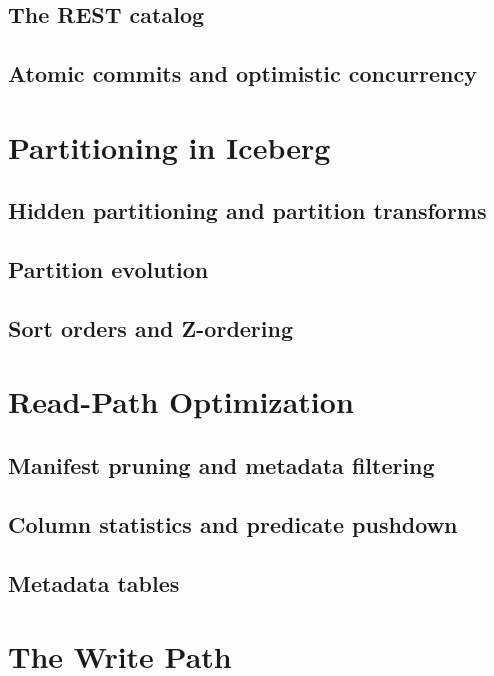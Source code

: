 \subsection{The REST catalog}
\tbd

\subsection{Atomic commits and optimistic concurrency}
\tbd

\section{Partitioning in Iceberg}
\label{sec:ice-partitioning}

\subsection{Hidden partitioning and partition transforms}
\tbd

\subsection{Partition evolution}
\tbd

\subsection{Sort orders and Z-ordering}
\tbd

\section{Read-Path Optimization}
\label{sec:ice-read}

\subsection{Manifest pruning and metadata filtering}
\tbd

\subsection{Column statistics and predicate pushdown}
\tbd

\subsection{Metadata tables}
\tbd

\section{The Write Path}
\label{sec:ice-write}


